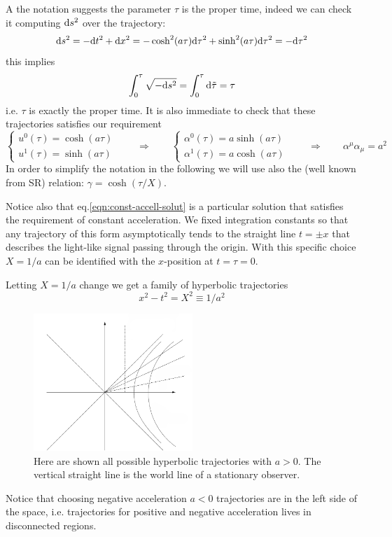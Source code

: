 \documentclass[../main/main.tex]{subfiles}
\begin{document}
A the notation suggests the parameter $\tau$ is the proper time, indeed we can check it computing $\textup{d} s^2$ over the trajectory:
\[\textup{d} s^2=-\textup{d} t^2+\textup{d} x^2=-\cosh^2(a\tau)\textup{d} \tau^2+\sinh^2(a\tau)\textup{d}\tau^2=-\textup{d}\tau^2\]
this implies
\[\int_0^\tau\sqrt{-\textup{d} s^2}=\int_0^\tau\textup{d}\tilde\tau=\tau\]
i.e. $\tau$ is exactly the proper time. 
It is also immediate to check that these trajectories satisfies our requirement
\[\begin{cases}
u^0(\tau)=\cosh(a\tau)\\
u^1(\tau)=\sinh(a\tau)
\end{cases}
\qquad
\Rightarrow
\qquad
\begin{cases}
\alpha^0(\tau)=a\sinh(a\tau)\\
\alpha^1(\tau)=a\cosh(a\tau)
\end{cases}
\qquad
\Rightarrow
\qquad
\alpha^\mu\alpha_\mu=a^2
\]
In order to simplify the notation in the following we will use also the (well known from SR) relation: $\gamma=\cosh(\tau/X)$.

Notice also that eq.\eqref{eqn:const-accell-solut} is a particular solution that satisfies the requirement of constant acceleration. We fixed integration constants so that any trajectory of this form asymptotically tends to the straight line $t=\pm x$ that describes the light-like signal passing through the origin. With this specific choice $X=1/a$ can be identified with the $x$-position at $t=\tau=0$.

Letting $X=1/a$ change we get a family of hyperbolic trajectories 
\[x^2-t^2=X^2\equiv1/a^2\]

\begin{figure}[H]
\centering
\includegraphics[width=6cm]{../img/rindler-space.png}
\caption{Here are shown all possible hyperbolic trajectories with $a>0$. The vertical straight line is the world line of a stationary observer.}
\end{figure}

Notice that choosing negative acceleration $a<0$ trajectories are in the left side of the space, i.e. trajectories for positive and negative acceleration lives in disconnected regions. 
\end{document}
